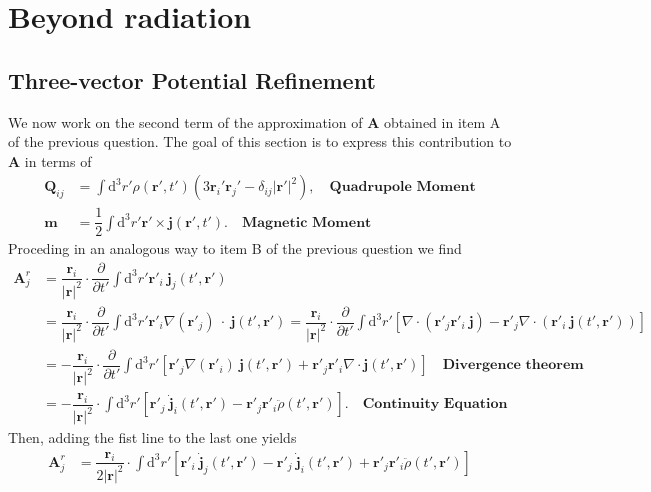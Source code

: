 \documentclass[10pt, a4paper]{article}
\begin{document}
{\section{Beyond radiation}
\subsection{Three-vector Potential Refinement}
We now work on the second term of the approximation of $\mathbf{A}$ obtained in item A of the previous question. The goal of this section is to express this contribution to $\mathbf{A}$ in terms of 
\begin{align*}
    \mathbf{Q}_{ij} &= \int \text{d}^3r' \rho(\mathbf{r}', t')(3\mathbf{r}_i'\mathbf{r}_j' - \delta_{ij}|\mathbf{r}'|^2),\quad \textbf{Quadrupole Moment}\\
    \mathbf{m} &= \dfrac{1}{2}\int \text{d}^3r' \mathbf{r}' \times \mathbf{j}(\mathbf{r}', t').\quad \textbf{Magnetic Moment}
\end{align*}
Proceding in an analogous way to item B of the previous question we find
\begin{align*}
    \mathbf{A}^{r}_{j} &= \dfrac{\mathbf{r}_i}{|\mathbf{r}|^2} \cdot  \dfrac{\partial}{\partial t'}\int \text{d}^3r' \mathbf{r}'_i\  \mathbf{j}_j(t', \mathbf{r}') \\&= \dfrac{\mathbf{r}_i}{|\mathbf{r}|^2} \cdot  \dfrac{\partial}{\partial t'}\int \text{d}^3r' \mathbf{r}'_i \nabla(\mathbf{r}'_j)\ \cdot \  \mathbf{j}(t', \mathbf{r}') = \dfrac{\mathbf{r}_i}{|\mathbf{r}|^2} \cdot  \dfrac{\partial}{\partial t'}\int \text{d}^3r'  \left[\nabla \cdot (\mathbf{r}'_j \mathbf{r}'_i \ \mathbf{j}) - \mathbf{r}'_j \nabla \cdot (\mathbf{r}'_i \ \mathbf{j}(t', \mathbf{r}'))\right]\\
     &=- \dfrac{\mathbf{r}_i}{|\mathbf{r}|^2} \cdot  \dfrac{\partial}{\partial t'}\int \text{d}^3r'  \left[ \mathbf{r}'_j \nabla (\mathbf{r}'_i) \ \mathbf{j}(t', \mathbf{r}') + \mathbf{r}'_j \mathbf{r}'_i\nabla \cdot \mathbf{j}(t', \mathbf{r}')\right] \quad  \textbf{Divergence theorem}\\
     &=- \dfrac{\mathbf{r}_i}{|\mathbf{r}|^2} \cdot \int \text{d}^3r'  \left[ \mathbf{r}'_j \ \dot{\mathbf{j}}_i(t', \mathbf{r}') - \mathbf{r}'_j \mathbf{r}'_i \ddot{\rho}(t', \mathbf{r}')\right]. \quad  \textbf{Continuity Equation}
\end{align*}
Then, adding the fist line to the last one yields
\begin{align*}
    \mathbf{A}^{r}_{j} 
     &=\dfrac{\mathbf{r}_i}{2|\mathbf{r}|^2} \cdot \int \text{d}^3r'  \left[ \mathbf{r}'_i\  \dot{\mathbf{j}}_j(t', \mathbf{r}')-\mathbf{r}'_j \ \dot{\mathbf{j}}_i(t', \mathbf{r}') + \mathbf{r}'_j \mathbf{r}'_i \ddot{\rho}(t', \mathbf{r}')\right] 
\end{align*}
}
\end{document}

